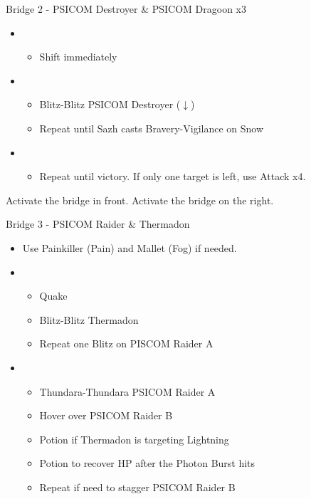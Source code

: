 \begin{multicols}{2}
\begin{battle}{Bridge 2 - PSICOM Destroyer \& PSICOM Dragoon x3}
\begin{itemize}
    \item \first
    \begin{itemize}
        \item Shift immediately
    \end{itemize}
    \item \third
    \begin{itemize}
        \item Blitz-Blitz PSICOM Destroyer ($\downarrow$)
        \item Repeat until Sazh casts Bravery-Vigilance on Snow
    \end{itemize}
    \item \fifth
    \begin{itemize}
        \item Repeat until victory. If only one target is left, use Attack x4.
    \end{itemize}
\end{itemize}
  
\end{battle}
Activate the bridge in front.  Activate the bridge on the right.
\begin{battle}{Bridge 3 - PSICOM Raider \& Thermadon}
\begin{itemize}
    \item Use Painkiller (Pain) and Mallet (Fog) if needed.
    \item \first
    \begin{itemize}
        \item Quake
        \item Blitz-Blitz Thermadon
        \item Repeat one Blitz on PISCOM Raider A
    \end{itemize}
    \item \second
    \begin{itemize}
        \item Thundara-Thundara PSICOM Raider A
        \item Hover over PSICOM Raider B
        \item Potion if Thermadon is targeting Lightning
        \item Potion to recover HP after the Photon Burst hits
        \item Repeat if need to stagger PSICOM Raider B

\end{itemize}
\end{itemize}
\end{battle}
\end{multicols}
